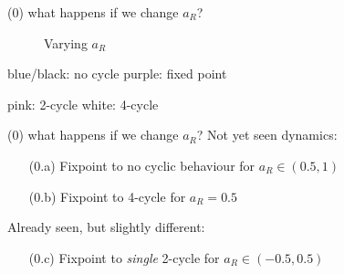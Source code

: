 \documentclass{beamer}
\newcounter{n}
\newcounter{f}
\begin{document}
\begin{frame}{(0) what happens if we change $a_R$?}
    \begin{figure}
        \centering
         \qquad
        \caption{Varying $a_R$}
    \end{figure}
    
    \hspace*{\fill}
    blue/black: no cycle
    \hspace*{\fill}
    purple: fixed point
    \hspace*{\fill}

    \hspace*{\fill}
    pink: 2-cycle
    \hspace*{\fill}
    white: 4-cycle
    \hspace*{\fill}
\end{frame}

\begin{frame}{(0) what happens if we change $a_R$?}
    Not yet seen dynamics:
    \begin{enumerate}
        \item[(0.a)] Fixpoint to no cyclic behaviour for $a_R \in (0.5, 1)$
        \item[(0.b)] Fixpoint to 4-cycle for $a_R = 0.5$
    \end{enumerate}

    \vspace*{2em}
    Already seen, but slightly different:
    \begin{enumerate}
        \item[(0.c)] Fixpoint to \textit{single} 2-cycle for $a_R \in (-0.5, 0.5)$
    \end{enumerate}
\end{frame}
\end{document}
